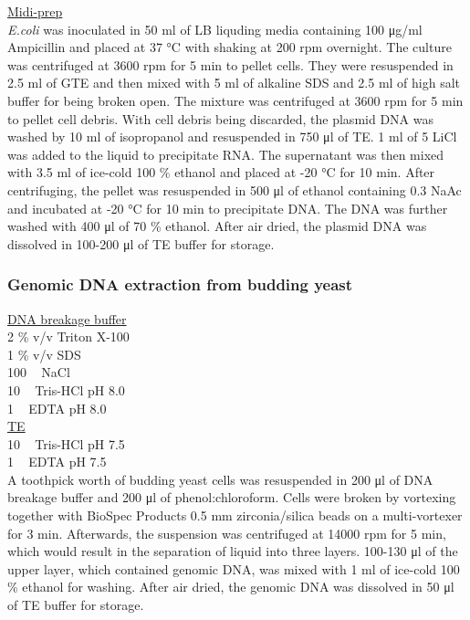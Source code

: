 \underline{Midi-prep}\\
\textit{E.coli} was inoculated in 50 \si{\milli\litre} of LB liquding media containing 100 \si{\micro\gram/\milli\litre} Ampicillin and placed at 37 \si{\celsius} with shaking at 200 rpm overnight. The culture was centrifuged at 3600 rpm for 5 \si{\minute} to pellet cells. They were resuspended in 2.5 \si{\milli\litre} of GTE and then mixed with 5 \si{\milli\litre} of alkaline SDS and 2.5 \si{\milli\litre} of high salt buffer for being broken open. The mixture was centrifuged at 3600 rpm for 5 \si{\minute} to pellet cell debris. With cell debris being discarded, the plasmid DNA was washed by 10 \si{\milli\litre} of isopropanol and resuspended in 750 \si{\micro\litre} of TE. 1 \si{\milli\litre} of 5 \si{\Molar} LiCl was added to the liquid to precipitate RNA. The supernatant was then mixed with 3.5 \si{\milli\litre} of ice-cold 100 \% ethanol and placed at -20 \si{\celsius} for 10 \si{\minute}. After centrifuging, the pellet was resuspended in 500 \si{\micro\litre} of ethanol containing 0.3 \si{\Molar} NaAc and incubated at -20 \si{\celsius} for 10 \si{\minute} to precipitate DNA. The DNA was further washed with 400 \si{\micro\litre} of 70 \% ethanol. After air dried, the plasmid DNA was dissolved in 100-200 \si{\micro\litre} of TE buffer for storage. 

\subsubsection{Genomic DNA extraction from budding yeast}
\underline{DNA breakage buffer}\\
2 \% v/v Triton X-100 \\
1 \% v/v SDS \\
100 \si{\milli\Molar} NaCl \\
10 \si{\milli\Molar} Tris-HCl pH 8.0 \\
1 \si{\milli\Molar} EDTA pH 8.0 \\

\underline{TE}\\
10 \si{\milli\Molar} Tris-HCl pH 7.5\\
1 \si{\milli\Molar} EDTA pH 7.5\\

A toothpick worth of budding yeast cells was resuspended in 200 \si{\micro\litre} of DNA breakage buffer and 200 \si{\micro\litre} of phenol:chloroform. Cells were broken by vortexing together with BioSpec Products 0.5 \si{\milli\metre} zirconia/silica beads on a multi-vortexer for 3 \si{\minute}. Afterwards, the suspension was centrifuged at 14000 rpm for 5 \si{\minute}, which would result in the separation of liquid into three layers. 100-130 \si{\micro\litre} of the upper layer, which contained genomic DNA, was mixed with 1 \si{\milli\litre} of ice-cold 100 \% ethanol for washing. After air dried, the genomic DNA was dissolved in 50 \si{\micro\litre} of TE buffer for storage.

